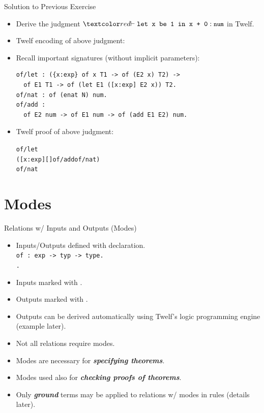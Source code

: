 \documentclass{beamer}
\renewcommand{\emph}[1]{\textbf{\textit{#1}}}
\begin{document}
\begin{frame}[containsverbatim]{Solution to Previous Exercise}
\begin{itemize}
\item Derive the judgment
$\cemph{\vdash \texttt{let x be 1 in x + 0} : \code{num}}$
in Twelf.

\item Twelf encoding of above judgment: \\

\item Recall important signatures (without implicit parameters):

\begin{verbatim}
of/let : ({x:exp} of x T1 -> of (E2 x) T2) ->
  of E1 T1 -> of (let E1 ([x:exp] E2 x)) T2.
of/nat : of (enat N) num.
of/add :
  of E2 num -> of E1 num -> of (add E1 E2) num.
\end{verbatim}

\item Twelf proof of above judgment:

\begin{alltt}
of/let
  ([x:exp] [] of/add of/nat )
  of/nat
\end{alltt}
\end{itemize}
\end{frame}


\section{Modes}

\begin{frame}{Relations w/ Inputs and Outputs (Modes)}
\begin{itemize}
\item Inputs/Outputs defined with \texttt{}
declaration. \\

\texttt{of : exp -> typ -> type.} \\
\texttt{.}

\item Inputs marked with \texttt{\cemph{+}}.
\item Outputs marked with \texttt{\cemph{-}}.

\pause
\item
Outputs can be derived automatically
using Twelf's logic programming engine
(example later).

\pause
\item
Not all relations require modes.

\item
Modes are necessary for \emph{specifying theorems}.

\item
Modes used also for \emph{checking proofs of theorems}.

\pause
\item
Only \emph{ground} terms may be applied to relations
w/ modes in rules (details later).
\end{itemize}
\end{frame}
\end{document}

